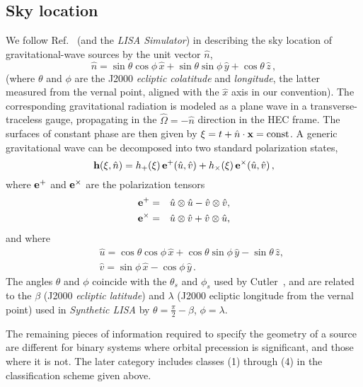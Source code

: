 \documentclass[11pt]{report}
\begin{document}
\subsection{Sky location}

We follow Ref.\ \cite{cr2003} (and the \emph{LISA Simulator}) in describing the sky location of
gravitational-wave sources by the unit vector $\hat{n}$,
%
\begin{equation}
\hat{n} = \sin\theta \cos\phi \, \hat{x} + \sin \theta\sin\phi \, \hat{y}+\cos\theta
\, \hat{z}\,,
\end{equation}
%
(where $\theta$ and $\phi$ are the J2000 \emph{ecliptic colatitude} and \emph{longitude},
the latter measured from the vernal point, aligned with the $\hat{x}$ axis in our convention).
The corresponding gravitational radiation is modeled as a plane wave in a transverse-traceless gauge, propagating
in the $\widehat\Omega=-\hat{n}$ direction in the HEC frame. The surfaces of constant phase are then
given by $\xi=t+\hat{n}\cdot {\bf x}={\rm const}$. A generic gravitational wave can be decomposed
into two standard polarization states,
%
\begin{equation}
\label{genh}
{\bf h}(\xi,\hat{n}) = h_{+}(\xi) \, {\bf e}^{+}(\hat{u},\hat{v}) + h_{\times}(\xi) \, {\bf e}^{\times}(\hat{u},\hat{v})\,,
\end{equation}
%
where ${\bf e}^{+}$ and ${\bf e}^{\times}$ are the polarization tensors
%
\begin{eqnarray}
\label{eten}
{\bf e}^{+} &=& \hat{u}\otimes \hat{u} - \hat{v}\otimes \hat{v},  \nonumber \\
{\bf e}^{\times} &=& \hat{u}\otimes \hat{v} + \hat{v}\otimes \hat{u},
\end{eqnarray}
%
and where
%
\begin{eqnarray}
\label{wave}
&&\hat{u} = \cos\theta\cos\phi \, \hat{x} +\cos\theta\sin\phi \,
\hat{y} -\sin\theta \, \hat{z}, \\
&&\hat{v} = \sin\phi \, \hat{x} -\cos\phi \, \hat{y} \, . \nonumber
\end{eqnarray}
%
The angles $\theta$ and $\phi$ coincide with the $\theta_s$ and $\phi_s$ used by Cutler~\cite{cutler98},
and are related to the $\beta$ (J2000 \emph{ecliptic latitude}) and $\lambda$ (J2000 ecliptic longitude from the vernal point) used in \emph{Synthetic LISA} \cite{synthlisa,vallis2005} by $\theta = \frac{\pi}{2} - \beta$, 
$\phi = \lambda$.

The remaining pieces of information required to specify the geometry of a source are different for binary systems 
where orbital precession is significant, and those where it is not. The later category includes classes (1) through (4) in the classification scheme given above.
\end{document}

